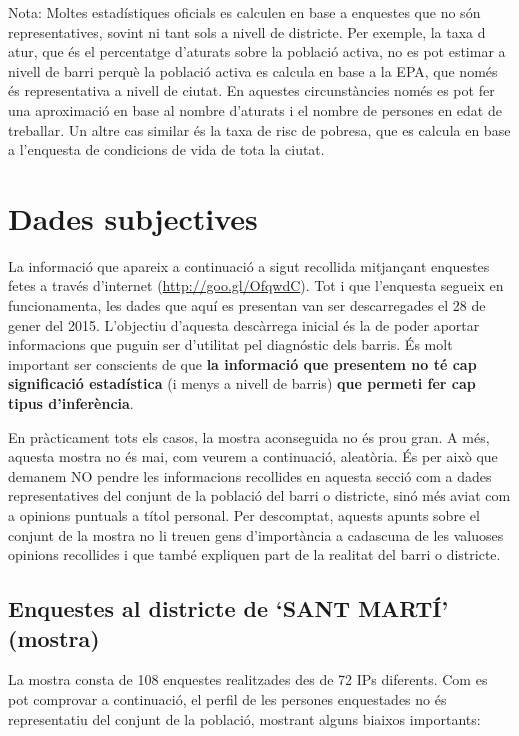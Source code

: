 \documentclass[]{article}
\begin{document}
Nota: Moltes estadístiques oficials es calculen en base a enquestes que
no són representatives, sovint ni tant sols a nivell de districte. Per
exemple, la taxa d atur, que és el percentatge d'aturats sobre la
població activa, no es pot estimar a nivell de barri perquè la població
activa es calcula en base a la EPA, que només és representativa a nivell
de ciutat. En aquestes circunstàncies només es pot fer una aproximació
en base al nombre d'aturats i el nombre de persones en edat de
treballar. Un altre cas similar és la taxa de risc de pobresa, que es
calcula en base a l'enquesta de condicions de vida de tota la ciutat.

\newpage

\section{\textbf{Dades subjectives}}\label{dades-subjectives}

La informació que apareix a continuació a sigut recollida mitjançant
enquestes fetes a través d'internet
(\href{http://goo.gl/OfqwdC}{\url{http://goo.gl/OfqwdC}}). Tot i que
l'enquesta segueix en funcionamenta, les dades que aquí es presentan van
ser descarregades el 28 de gener del 2015. L'objectiu d'aquesta
descàrrega inicial és la de poder aportar informacions que puguin ser
d'utilitat pel diagnóstic dels barris. És molt important ser conscients
de que \textbf{la informació que presentem no té cap significació
estadística} (i menys a nivell de barris) \textbf{que permeti fer cap
tipus d'inferència}.

En pràcticament tots els casos, la mostra aconseguida no és prou gran. A
més, aquesta mostra no és mai, com veurem a continuació, aleatòria. És
per això que demanem NO pendre les informacions recollides en aquesta
secció com a dades representatives del conjunt de la població del barri
o districte, sinó més aviat com a opinions puntuals a títol personal.
Per descomptat, aquests apunts sobre el conjunt de la mostra no li
treuen gens d'importància a cadascuna de les valuoses opinions
recollides i que també expliquen part de la realitat del barri o
districte.

\subsection{Enquestes al districte de `SANT MARTÍ'
(mostra)}\label{enquestes-al-districte-de-sant-marti-mostra}

La mostra consta de 108 enquestes realitzades des de 72 IPs diferents.
Com es pot comprovar a continuació, el perfil de les persones
enquestades no és representatiu del conjunt de la població, mostrant
alguns biaixos importants:
\end{document}
